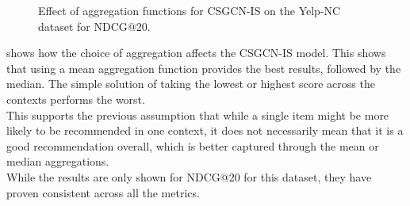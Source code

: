 \begin{figure}
    \caption{Effect of aggregation functions for CSGCN-IS on the Yelp-NC dataset for NDCG@20.}
    \label{fig:aggregation_effect}
\end{figure}
 shows how the choice of aggregation affects the CSGCN-IS model.
This shows that using a mean aggregation function provides the best results, followed by the median.
The simple solution of taking the lowest or highest score across the contexts performs the worst.\\
This supports the previous assumption that while a single item might be more likely to be recommended in one context, it does not necessarily mean that it is a good recommendation overall, which is better captured through the mean or median aggregations.\\
While the results are only shown for NDCG@20 for this dataset, they have proven consistent across all the metrics.

